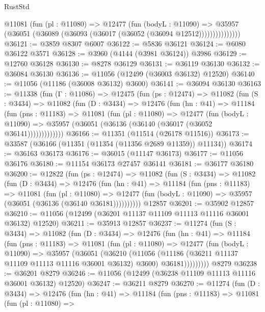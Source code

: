 \begin{lexlean}{RustStd}
\begin{coremodule}
                @11081
                  (fun (pl : @11080) =>
                  @12477
                    (fun (bodyL : @11090) =>
                    @35957 (@36051 (@36089 (@36093 (@36017 (@36052 (@36094 @12512)))))))))))))))
@36121 := @3859 @8307 @6007
@36122 := @5836 @36121
@36124 := @6080 @36122 @3571
@36128 := @3960 (@4144 (@3981 @36124)) @3986
@36129 := @12760 @36128
@36130 := @8278 @36129
@36131 := @36119 @36130
@36132 := @36084 @36130
@36136 := @11056 (@12499 (@36003 @36132) @12520)
@36140 := @11056 (@11186 (@36008 @36132) @3600)
@36141 := @36094 @36130
@36163 := @11338
    (fun (Γ : @11086) =>
    @12475
      (fun (ps : @12474) =>
      @11082
        (fun (S : @3434) =>
        @11082
          (fun (D : @3434) =>
          @12476
            (fun (hn : @41) =>
            @11184
              (fun (pns : @11183) =>
              @11081
                (fun (pl : @11080) =>
                @12477
                  (fun (bodyL : @11090) =>
                  @35957 (@36051 (@36136 (@36140 (@36017 (@36052 @36141)))))))))))))
@36166 := @11351 (@11514 (@26178 @11516))
@36173 := @33587 (@36166 (@11351 (@11354 (@11356 @2689 @11359)) @11134))
@36174 := @36163 @36173
@36176 := @36015 (@11147 @36173)
@36177 := @11056 @36176
@36180 := @11154 @36173 @27457 @36141
@36181 := @36177 @36180
@36200 := @12822
    (fun (ps : @12474) =>
    @11082
      (fun (S : @3434) =>
      @11082
        (fun (D : @3434) =>
        @12476
          (fun (hn : @41) =>
          @11184
            (fun (pns : @11183) =>
            @11081
              (fun (pl : @11080) =>
              @12477 (fun (bodyL : @11090) => @35957 (@36051 (@36136 (@36140 @36181))))))))))
    @12857
@36201 := @35902 @12857
@36210 := @11056 (@12499 (@36201 @11137 @11109 @11113 @11116 @36001 @36132) @12520)
@36211 := @35913 @12857
@36237 := @11274
    (fun (S : @3434) =>
    @11082
      (fun (D : @3434) =>
      @12476
        (fun (hn : @41) =>
        @11184
          (fun (pns : @11183) =>
          @11081
            (fun (pl : @11080) =>
            @12477
              (fun (bodyL : @11090) =>
              @35957
                (@36051
                  (@36210
                    (@11056
                      (@11186 (@36211 @11137 @11109 @11113 @11116 @36001 @36132) @3600)
                      @36181)))))))))
    @8279
@36238 := @36201 @8279
@36246 := @11056 (@12499 (@36238 @11109 @11113 @11116 @36001 @36132) @12520)
@36247 := @36211 @8279
@36270 := @11274
    (fun (D : @3434) =>
    @12476
      (fun (hn : @41) =>
      @11184
        (fun (pns : @11183) =>
        @11081
          (fun (pl : @11080) =>

\end{coremodule}
\end{lexlean}
